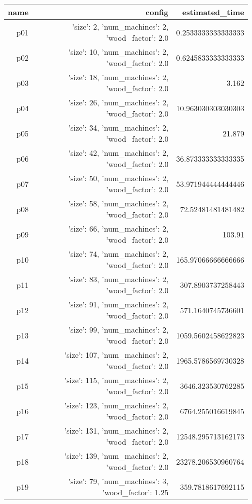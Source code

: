 \documentclass{article}
\begin{document}
                            \begin{center}
                            \scriptsize
                            \begin{tabular}{r|r|r}
                            name & config & estimated\_time\\\midrule
                              p01&{'size': 2, 'num\_machines': 2, 'wood\_factor': 2.0}&0.2533333333333333\\
  p02&{'size': 10, 'num\_machines': 2, 'wood\_factor': 2.0}&0.6245833333333333\\
  p03&{'size': 18, 'num\_machines': 2, 'wood\_factor': 2.0}&3.162\\
  p04&{'size': 26, 'num\_machines': 2, 'wood\_factor': 2.0}&10.963030303030303\\
  p05&{'size': 34, 'num\_machines': 2, 'wood\_factor': 2.0}&21.879\\
  p06&{'size': 42, 'num\_machines': 2, 'wood\_factor': 2.0}&36.873333333333335\\
  p07&{'size': 50, 'num\_machines': 2, 'wood\_factor': 2.0}&53.971944444444446\\
  p08&{'size': 58, 'num\_machines': 2, 'wood\_factor': 2.0}&72.52481481481482\\
  p09&{'size': 66, 'num\_machines': 2, 'wood\_factor': 2.0}&103.91\\
  p10&{'size': 74, 'num\_machines': 2, 'wood\_factor': 2.0}&165.97066666666666\\
  p11&{'size': 83, 'num\_machines': 2, 'wood\_factor': 2.0}&307.8903737258443\\
  p12&{'size': 91, 'num\_machines': 2, 'wood\_factor': 2.0}&571.1640745736601\\
  p13&{'size': 99, 'num\_machines': 2, 'wood\_factor': 2.0}&1059.5602458622823\\
  p14&{'size': 107, 'num\_machines': 2, 'wood\_factor': 2.0}&1965.5786569730328\\
  p15&{'size': 115, 'num\_machines': 2, 'wood\_factor': 2.0}&3646.323530762285\\
  p16&{'size': 123, 'num\_machines': 2, 'wood\_factor': 2.0}&6764.255016619845\\
  p17&{'size': 131, 'num\_machines': 2, 'wood\_factor': 2.0}&12548.295713162173\\
  p18&{'size': 139, 'num\_machines': 2, 'wood\_factor': 2.0}&23278.206530960764\\
  p19&{'size': 79, 'num\_machines': 3, 'wood\_factor': 1.25}&359.7818617692115\\

\end{tabular}
\end{center}
\end{document}
